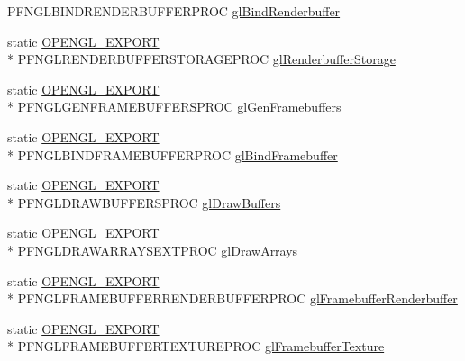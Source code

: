 \begin{DoxyCompactItemize}
P\+F\+N\+G\+L\+B\+I\+N\+D\+R\+E\+N\+D\+E\+R\+B\+U\+F\+F\+E\+R\+P\+R\+O\+C \hyperlink{class_agmd_1_1_g_l_driver_a1965718026372f3ed384516bffff3da2}{gl\+Bind\+Renderbuffer}
\item 
static \hyperlink{_config_8h_a77401aa3bc0a379879047c1bd30f262e}{O\+P\+E\+N\+G\+L\+\_\+\+E\+X\+P\+O\+R\+T} \\*
P\+F\+N\+G\+L\+R\+E\+N\+D\+E\+R\+B\+U\+F\+F\+E\+R\+S\+T\+O\+R\+A\+G\+E\+P\+R\+O\+C \hyperlink{class_agmd_1_1_g_l_driver_aafe5a377b329593d6b633e3656ed36d4}{gl\+Renderbuffer\+Storage}
\item 
static \hyperlink{_config_8h_a77401aa3bc0a379879047c1bd30f262e}{O\+P\+E\+N\+G\+L\+\_\+\+E\+X\+P\+O\+R\+T} \\*
P\+F\+N\+G\+L\+G\+E\+N\+F\+R\+A\+M\+E\+B\+U\+F\+F\+E\+R\+S\+P\+R\+O\+C \hyperlink{class_agmd_1_1_g_l_driver_abf63a5e6e3d3fcf53119f36c0a61c317}{gl\+Gen\+Framebuffers}
\item 
static \hyperlink{_config_8h_a77401aa3bc0a379879047c1bd30f262e}{O\+P\+E\+N\+G\+L\+\_\+\+E\+X\+P\+O\+R\+T} \\*
P\+F\+N\+G\+L\+B\+I\+N\+D\+F\+R\+A\+M\+E\+B\+U\+F\+F\+E\+R\+P\+R\+O\+C \hyperlink{class_agmd_1_1_g_l_driver_ade8af0da263156f979f8b3de3ac35a1e}{gl\+Bind\+Framebuffer}
\item 
static \hyperlink{_config_8h_a77401aa3bc0a379879047c1bd30f262e}{O\+P\+E\+N\+G\+L\+\_\+\+E\+X\+P\+O\+R\+T} \\*
P\+F\+N\+G\+L\+D\+R\+A\+W\+B\+U\+F\+F\+E\+R\+S\+P\+R\+O\+C \hyperlink{class_agmd_1_1_g_l_driver_ab6a97f13f70e33befca18717861e45df}{gl\+Draw\+Buffers}
\item 
static \hyperlink{_config_8h_a77401aa3bc0a379879047c1bd30f262e}{O\+P\+E\+N\+G\+L\+\_\+\+E\+X\+P\+O\+R\+T} \\*
P\+F\+N\+G\+L\+D\+R\+A\+W\+A\+R\+R\+A\+Y\+S\+E\+X\+T\+P\+R\+O\+C \hyperlink{class_agmd_1_1_g_l_driver_a1e0cc5c907c73d0a3582a8c5eda7bf1b}{gl\+Draw\+Arrays}
\item 
static \hyperlink{_config_8h_a77401aa3bc0a379879047c1bd30f262e}{O\+P\+E\+N\+G\+L\+\_\+\+E\+X\+P\+O\+R\+T} \\*
P\+F\+N\+G\+L\+F\+R\+A\+M\+E\+B\+U\+F\+F\+E\+R\+R\+E\+N\+D\+E\+R\+B\+U\+F\+F\+E\+R\+P\+R\+O\+C \hyperlink{class_agmd_1_1_g_l_driver_a3818929692ec671d26b3b504a0cbf064}{gl\+Framebuffer\+Renderbuffer}
\item 
static \hyperlink{_config_8h_a77401aa3bc0a379879047c1bd30f262e}{O\+P\+E\+N\+G\+L\+\_\+\+E\+X\+P\+O\+R\+T} \\*
P\+F\+N\+G\+L\+F\+R\+A\+M\+E\+B\+U\+F\+F\+E\+R\+T\+E\+X\+T\+U\+R\+E\+P\+R\+O\+C \hyperlink{class_agmd_1_1_g_l_driver_a9d3330527b02d8661b93dd8bd3f602cd}{gl\+Framebuffer\+Texture}

\end{DoxyCompactItemize}
